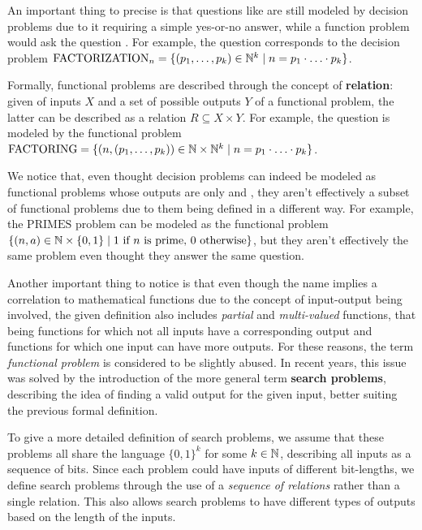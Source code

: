 An important thing to precise is that questions like  are still modeled by decision problems due to it requiring a simple yes-or-no answer, while a function problem would ask the question . For example, the question  corresponds to the decision problem $\mathrm{FACTORIZATION}_n = \{(p_1, \ldots, p_k) \in \mathbb{N}^k \mid n = p_1 \cdot \ldots \cdot p_k\}$.

Formally, functional problems are described through the concept of \textbf{relation}: given of inputs $X$ and a set of possible outputs $Y$ of a functional problem, the latter can be described as a relation $R \subseteq X \times Y$. For example, the question  is modeled by the functional problem $\mathrm{FACTORING} = \{(n, (p_1, \ldots, p_k)) \in \mathbb{N} \times \mathbb{N}^k \mid n = p_1 \cdot \ldots \cdot p_k\}$.

We notice that, even thought decision problems can indeed be modeled as functional problems whose outputs are only  and , they aren't effectively a subset of functional problems due to them being defined in a different way. For example, the $\mathrm{PRIMES}$ problem can be modeled as the functional problem $\{(n, a) \in \mathbb{N} \times \{0,1\} \mid 1 \text{ if } n \text{ is prime, } 0 \text{ otherwise}\}$, but they aren't effectively the same problem even thought they answer the same question.

Another important thing to notice is that even though the name implies a correlation to mathematical functions due to the concept of input-output being involved, the given definition also includes \textit{partial} and \textit{multi-valued} functions, that being functions for which not all inputs have a corresponding output and functions for which one input can have more outputs. For these reasons, the term \textit{functional problem} is considered to be slightly abused. In recent years, this issue was solved by the introduction of the more general term \textbf{search problems}, describing the idea of finding a valid output for the given input, better suiting the previous formal definition.

To give a more detailed definition of search problems, we assume that these problems all share the language $\{0,1\}^k$ for some $k \in \mathbb{N}$, describing all inputs as a sequence of bits. Since each problem could have inputs of different bit-lengths, we define search problems through the use of a \textit{sequence of relations} rather than a single relation. This also allows search problems to have different types of outputs based on the length of the inputs. 

